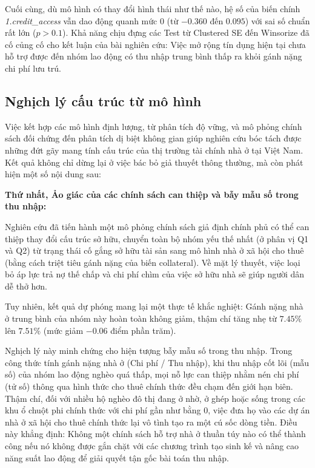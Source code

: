 \documentclass[12pt,a4paper]{report}
\begin{document}
Cuối cùng, dù mô hình có thay đổi hình thái như thế nào, hệ số của biến chính \textit{1.credit\_access} vẫn dao động quanh mức 0 (từ $-0.360$ đến $0.095$) với sai số chuẩn rất lớn ($p > 0.1$). Khả năng chịu đựng các Test từ Clustered SE đến Winsorize đã cố củng cố cho kết luận của bài nghiên cứu: Việc mở rộng tín dụng hiện tại chưa hỗ trợ được đến nhóm lao động có thu nhập trung bình thấp ra khỏi gánh nặng chi phí lưu trú.

\newpage
\subsection{Nghịch lý cấu trúc từ mô hình}

Việc kết hợp các mô hình định lượng, từ phân tích độ vững, và mô phỏng chính sách đối chứng đến phân tích dị biệt không gian giúp nghiên cứu bóc tách được những đứt gãy mang tính cấu trúc của thị trường tài chính nhà ở tại Việt Nam. Kết quả không chỉ dừng lại ở việc bác bỏ giả thuyết thông thường, mà còn phát hiện một số nội dung sau:

\textbf{Thứ nhất, Ảo giác của các chính sách can thiệp và bẫy mẫu số trong thu nhập:} 

Nghiên cứu đã tiến hành một mô phỏng chính sách giả định chính phủ có thể can thiệp thay đổi cấu trúc sở hữu, chuyển toàn bộ nhóm yếu thế nhất (ở phân vị Q1 và Q2) từ trạng thái cố gắng sở hữu tài sản sang mô hình nhà ở xã hội cho thuê (bằng cách triệt tiêu gánh nặng của biến collateral). Về mặt lý thuyết, việc loại bỏ áp lực trả nợ thế chấp và chi phí chìm của việc sở hữu nhà sẽ giúp người dân dễ thở hơn. 

Tuy nhiên, kết quả dự phóng mang lại một thực tế khắc nghiệt: Gánh nặng nhà ở trung bình của nhóm này hoàn toàn không giảm, thậm chí tăng nhẹ từ $7.45\%$ lên $7.51\%$ (mức giảm $-0.06$ điểm phần trăm). 

Nghịch lý này minh chứng cho hiện tượng bẫy mẫu số trong thu nhập. Trong công thức tính gánh nặng nhà ở (Chi phí / Thu nhập), khi thu nhập cốt lõi (mẫu số) của nhóm lao động nghèo quá thấp, mọi nỗ lực can thiệp nhằm nén chi phí (tử số) thông qua hình thức cho thuê chính thức đều chạm đến giới hạn biên. Thậm chí, đối với nhiều hộ nghèo đô thị đang ở nhờ, ở ghép hoặc sống trong các khu ổ chuột phi chính thức với chi phí gần như bằng $0$, việc đưa họ vào các dự án nhà ở xã hội cho thuê chính thức lại vô tình tạo ra một cú sốc dòng tiền. Điều này khẳng định: Không một chính sách hỗ trợ nhà ở thuần túy nào có thể thành công nếu nó không được gắn chặt với các chương trình tạo sinh kế và nâng cao năng suất lao động để giải quyết tận gốc bài toán thu nhập.
\end{document}
